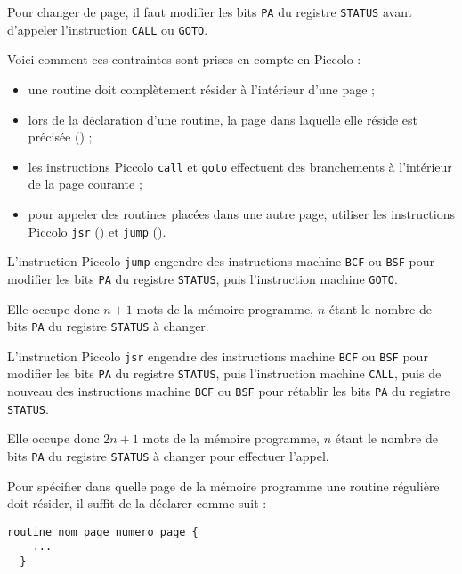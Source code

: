 Pour changer de page, il faut modifier les bits \texttt{PA} du registre \texttt{STATUS} avant d'appeler l'instruction \texttt{CALL} ou \texttt{GOTO}.

Voici comment ces contraintes sont prises en compte en Piccolo :
\begin{itemize}
  \item une routine doit complètement résider à l'intérieur d'une page ;
  \item lors de la déclaration d'une routine, la page dans laquelle elle réside est précisée () ;
  \item les instructions Piccolo \texttt{call} et \texttt{goto} effectuent des branchements à l'intérieur de la page courante ;
  \item pour appeler des routines placées dans une autre page, utiliser les instructions Piccolo \texttt{jsr} () et \texttt{jump} ().
\end{itemize}




L'instruction Piccolo  \texttt{jump} engendre des instructions machine \texttt{BCF} ou \texttt{BSF} pour modifier les bits \texttt{PA} du registre \texttt{STATUS}, puis l'instruction machine \texttt{GOTO}.

Elle occupe donc $n+1$ mots de la mémoire programme, $n$ étant le nombre de bits \texttt{PA} du registre \texttt{STATUS} à changer.





L'instruction Piccolo  \texttt{jsr} engendre des instructions machine \texttt{BCF} ou \texttt{BSF} pour modifier les bits \texttt{PA} du registre \texttt{STATUS}, puis l'instruction machine \texttt{CALL}, puis de nouveau des instructions machine \texttt{BCF} ou \texttt{BSF} pour rétablir les bits \texttt{PA} du registre \texttt{STATUS}.

Elle occupe donc $2n+1$ mots de la mémoire programme, $n$ étant le nombre de bits \texttt{PA} du registre \texttt{STATUS} à changer pour effectuer l'appel.


Pour spécifier dans quelle page de la mémoire programme une routine régulière doit résider, il suffit de la déclarer comme suit :
\begin{lstlisting}[language=piccolo]
  routine nom page numero_page {
    ...
  }
\end{lstlisting}

